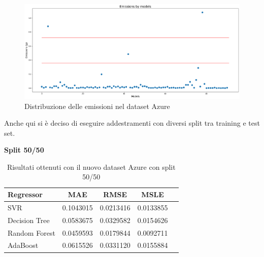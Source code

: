 \begin{figure}[H]
    \centering
    \includegraphics[width=\textwidth]{images/nuova-situazione2.png}
    \caption{Distribuzione delle emissioni nel dataset Azure}
\end{figure}


\noindent Anche qui si è deciso di eseguire addestramenti con diversi split tra training e test set.

\noindent\textbf{Split 50/50}

\begin{table}[H]
    \centering
    \begin{tabular}{|>{\centering\arraybackslash}m{5cm}|c|c|c|c|}
        \hline
        \textbf{Regressor} & \textbf{MAE} & \textbf{RMSE} & \textbf{MSLE} \\ [10pt]
        \hline
        SVR & 0.1043015 & 0.0213416 & 0.0133855 \\ [10pt]
        \hline
        Decision Tree & 0.0583675 & 0.0329582 & 0.0154626 \\ [10pt]
        \hline
        Random Forest & 0.0459593 & 0.0179844 & 0.0092711 \\ [10pt]
        \hline
        AdaBoost & 0.0615526 & 0.0331120 & 0.0155884 \\ [10pt]
        \hline
    \end{tabular}
    \caption{Risultati ottenuti con il nuovo dataset Azure con split 50/50}
    \label{tab:results}
\end{table}

